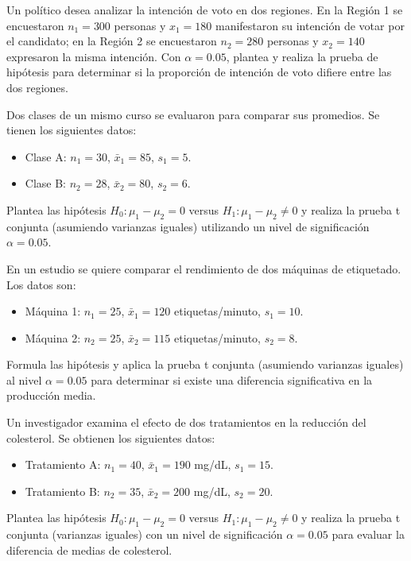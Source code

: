 \documentclass[addpoints,12pt]{exam}
\theoremstyle{plain}
\theoremstyle{remark}
\theoremstyle{definition}
\begin{document}
\begin{questions}
     \question
    Un político desea analizar la intención de voto en dos regiones. En la Región 1 se encuestaron \( n_1 = 300 \) personas y \( x_1 = 180 \) manifestaron su intención de votar por el candidato; en la Región 2 se encuestaron \( n_2 = 280 \) personas y \( x_2 = 140 \) expresaron la misma intención. Con \(\alpha = 0.05\), plantea y realiza la prueba de hipótesis para determinar si la proporción de intención de voto difiere entre las dos regiones.


 \question Dos clases de un mismo curso se evaluaron para comparar sus promedios. Se tienen los siguientes datos:
    \begin{itemize}
        \item Clase A: \( n_1 = 30 \), \(\bar{x}_1 = 85\), \( s_1 = 5 \).
        \item Clase B: \( n_2 = 28 \), \(\bar{x}_2 = 80\), \( s_2 = 6 \).
    \end{itemize}
    Plantea las hipótesis \(H_0: \mu_1 - \mu_2 = 0\) versus \(H_1: \mu_1 - \mu_2 \neq 0\) y realiza la prueba t conjunta (asumiendo varianzas iguales) utilizando un nivel de significación \(\alpha = 0.05\).

 \question En un estudio se quiere comparar el rendimiento de dos máquinas de etiquetado. Los datos son:
    \begin{itemize}
        \item Máquina 1: \( n_1 = 25 \), \(\bar{x}_1 = 120\) etiquetas/minuto, \( s_1 = 10 \).
        \item Máquina 2: \( n_2 = 25 \), \(\bar{x}_2 = 115\) etiquetas/minuto, \( s_2 = 8 \).
    \end{itemize}
    Formula las hipótesis y aplica la prueba t conjunta (asumiendo varianzas iguales) al nivel \(\alpha = 0.05\) para determinar si existe una diferencia significativa en la producción media.

 \question   Un investigador examina el efecto de dos tratamientos en la reducción del colesterol. Se obtienen los siguientes datos:
    \begin{itemize}
        \item Tratamiento A: \( n_1 = 40 \), \(\bar{x}_1 = 190\) mg/dL, \( s_1 = 15 \).
        \item Tratamiento B: \( n_2 = 35 \), \(\bar{x}_2 = 200\) mg/dL, \( s_2 = 20 \).
    \end{itemize}
    Plantea las hipótesis \(H_0: \mu_1 - \mu_2 = 0\) versus \(H_1: \mu_1 - \mu_2 \neq 0\) y realiza la prueba t conjunta (varianzas iguales) con un nivel de significación \(\alpha = 0.05\) para evaluar la diferencia de medias de colesterol.


\end{questions}
\end{document}
